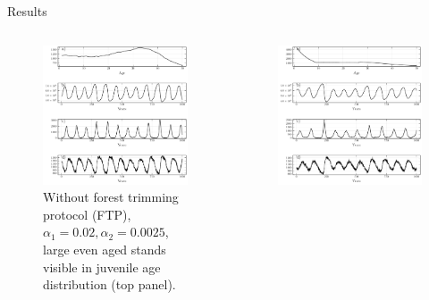 \documentclass{beamer}
\begin{document}
\begin{frame}{Results}
    \begin{columns}
        \begin{column}[]{0.5\textwidth}
            \begin{figure}
                \includegraphics[width=\textwidth]{mpb/z1_ts.pdf}
                \caption{\small Without forest trimming protocol (FTP), $\alpha_1 = 0.02,  \alpha_2 = 0.0025$, large even aged stands visible in juvenile age distribution (top panel).}
            \end{figure}
        \end{column}
        \begin{column}[]{0.5\textwidth}
            \begin{figure}
                \includegraphics[width=\textwidth]{mpb/z1_ftp.pdf}

\end{figure}
\end{column}
\end{columns}
\end{frame}
\end{document}
